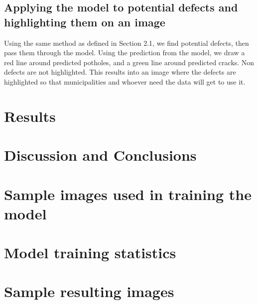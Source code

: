 \documentclass[12pt, letterpaper, twoside]{article}
\begin{document}
\subsection{Applying the model to potential defects and highlighting them on an image}

Using the same method as defined in Section 2.1, we find potential defects, then pass them through the model.
Using the prediction from the model, we draw a red line around predicted potholes, and a green line around predicted cracks.
Non defects are not highlighted.
This results into an image where the defects are highlighted so that municipalities and whoever need the data will get to use it.

\section{Results}
\label{sec:resu}



\section{Discussion and Conclusions}
\label{sec:conc}





% 
% 

\appendix

\section{Sample images used in training the model}

\section{Model training statistics}

\section{Sample resulting images}
\end{document}
